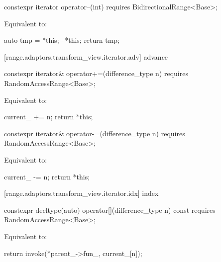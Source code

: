 \begin{itemdecl}
constexpr iterator operator--(int) requires BidirectionalRange<Base>;
\end{itemdecl}

\begin{itemdescr}
\pnum
\effects Equivalent to:
\begin{codeblock}
auto tmp = *this;
--*this;
return tmp;
\end{codeblock}
\end{itemdescr}

[range.adaptors.transform_view.iterator.adv]{ advance}

\begin{itemdecl}
constexpr iterator& operator+=(difference_type n)
  requires RandomAccessRange<Base>;
\end{itemdecl}

\begin{itemdescr}
\pnum
\effects Equivalent to:
\begin{codeblock}
current_ += n;
return *this;
\end{codeblock}
\end{itemdescr}

%
\begin{itemdecl}
constexpr iterator& operator-=(difference_type n)
  requires RandomAccessRange<Base>;
\end{itemdecl}

\begin{itemdescr}
\pnum
\effects Equivalent to:
\begin{codeblock}
current_ -= n;
return *this;
\end{codeblock}
\end{itemdescr}

[range.adaptors.transform_view.iterator.idx]{ index}

\begin{itemdecl}
constexpr decltype(auto) operator[](difference_type n) const
  requires RandomAccessRange<Base>;
\end{itemdecl}

\begin{itemdescr}
\pnum
\effects Equivalent to:
\begin{codeblock}
return invoke(*parent_->fun_, current_[n]);
\end{codeblock}
\end{itemdescr}

